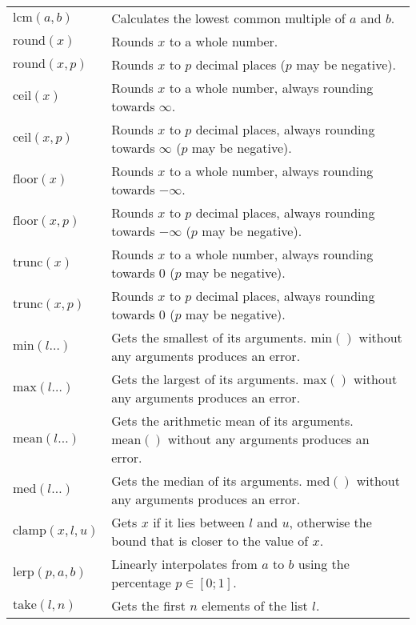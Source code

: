 \documentclass[10pt]{article}
\newcommand{\tabgap}{\vspace{3mm}\\}
\begin{document}
\begin{longtable}{p{}p{}}
        $ \mathrm{lcm}(a, b) $                     & Calculates the lowest common multiple of $ a $ and $ b $. \tabgap
        $ \mathrm{round}(x) $                      & Rounds $ x $ to a whole number. \\
        $ \mathrm{round}(x, p) $                   & Rounds $ x $ to $ p $ decimal places ($ p $ may be negative). \\
        $ \mathrm{ceil}(x) $                       & Rounds $ x $ to a whole number, always rounding towards $ \infty $. \\
        $ \mathrm{ceil}(x, p) $                    & Rounds $ x $ to $ p $ decimal places, always rounding towards $ \infty $ ($ p $ may be negative). \\
        $ \mathrm{floor}(x) $                      & Rounds $ x $ to a whole number, always rounding towards $ -\infty $. \\
        $ \mathrm{floor}(x, p) $                   & Rounds $ x $ to $ p $ decimal places, always rounding towards $ -\infty $ ($ p $ may be negative). \\
        $ \mathrm{trunc}(x) $                      & Rounds $ x $ to a whole number, always rounding towards $ 0 $ ($ p $ may be negative). \\
        $ \mathrm{trunc}(x, p) $                   & Rounds $ x $ to $ p $ decimal places, always rounding towards $ 0 $ ($ p $ may be negative). \tabgap
        $ \mathrm{min}(l\dots) $                   & Gets the smallest of its arguments. $ \mathrm{min}() $ without any arguments produces an error. \\
        $ \mathrm{max}(l\dots) $                   & Gets the largest of its arguments. $ \mathrm{max}() $ without any arguments produces an error. \\
        $ \mathrm{mean}(l\dots) $                  & Gets the arithmetic mean of its arguments. $ \mathrm{mean}() $ without any arguments produces an error. \\
        $ \mathrm{med}(l\dots) $                   & Gets the median of its arguments. $ \mathrm{med}() $ without any arguments produces an error. \tabgap
        $ \mathrm{clamp}(x, l, u) $                & Gets $ x $ if it lies between $ l $ and $ u $, otherwise the bound that is closer to the value of $ x $. \\
        $ \mathrm{lerp}(p, a, b) $                 & Linearly interpolates from $ a $ to $ b $ using the percentage $ p \in [0;1] $. \tabgap
        $ \mathrm{take}(l, n) $                    & Gets the first $ n $ elements of the list $ l $. \\

\end{longtable}
\end{document}
